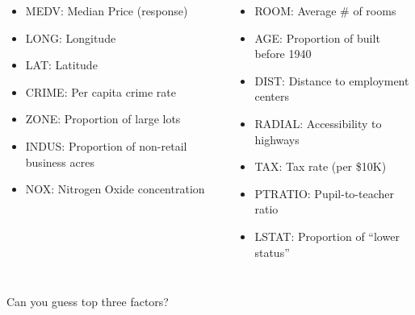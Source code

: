 \documentclass{beamer}\usepackage[]{graphicx}\usepackage[]{color}
\makeatletter
\newcommand{\hlstr}[1]{\textcolor[rgb]{1,0.894,0.71}{#1}}%
\newcommand{\hlopt}[1]{\textcolor[rgb]{1,0.894,0.769}{#1}}%
\newcommand{\hlstd}[1]{\textcolor[rgb]{1,0.894,0.769}{#1}}%
\newcommand{\hlkwc}[1]{\textcolor[rgb]{0.78,0.941,0.545}{#1}}%
\newcommand{\hlkwd}[1]{\textcolor[rgb]{1,0.78,0.769}{#1}}%
\newenvironment{kframe}{%
 \def\at@end@of@kframe{}%
 \ifinner\ifhmode%
  \def\at@end@of@kframe{\end{minipage}}%
  \begin{minipage}{\columnwidth}%
 \fi\fi%
 \def\FrameCommand##1{\hskip\@totalleftmargin \hskip-\fboxsep
 \colorbox{shadecolor}{##1}\hskip-\fboxsep
     \hskip-\linewidth \hskip-\@totalleftmargin \hskip\columnwidth}%
 \MakeFramed {\advance\hsize-\width
   \@totalleftmargin\z@ \linewidth\hsize
   \@setminipage}}%
 {\par\unskip\endMakeFramed%
 \at@end@of@kframe}
\newenvironment{knitrout}{}{} %
\makeatother
\begin{document}
\begin{darkframes}
\begin{frame}
      \begin{columns}[onlytextwidth]
          \begin{itemize}
            \item MEDV: Median Price (response)
            \item LONG: Longitude
            \item LAT: Latitude
            \item CRIME: Per capita crime rate
            \item ZONE: Proportion of large lots
            \item INDUS: Proportion of non-retail business acres
            \item NOX: Nitrogen Oxide concentration
          \end{itemize}
          \begin{itemize}
            \item ROOM: Average \# of rooms
            \item AGE: Proportion of built before 1940
            \item DIST: Distance to employment centers
            \item RADIAL: Accessibility to highways
            \item TAX: Tax rate (per \$10K)
            \item PTRATIO: Pupil-to-teacher ratio
            \item LSTAT: Proportion of ``lower status''
          \end{itemize}
      \end{columns}
    
    \end{frame}
    
    
    
    
    
    \begin{frame}
        Can you guess top three factors?
        \lc
    \end{frame}
    
    
    
    
\end{darkframes}
\end{document}
